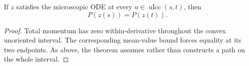 \begin{theorem}
\label{thm:microscopic:momentum-endpoints}
If $z$ satisfies the microscopic ODE at every
$u\in\operatorname{uIcc}(s,t)$, then
\[
  P(z(s))=P(z(t)).
\]
\end{theorem}
\begin{proof}

\leanok
Total momentum has zero within-derivative throughout the convex unoriented
interval.  The corresponding mean-value bound forces equality at its two
endpoints.  As above, the theorem assumes rather than constructs a path on the
whole interval.
\end{proof}
